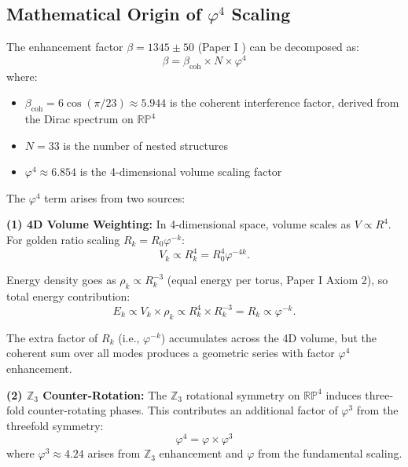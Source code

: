\subsection{Mathematical Origin of $\varphi^4$ Scaling}

The enhancement factor $\beta = 1345 \pm 50$ (Paper I \citep{Peacock2026a}) can be decomposed as:
\begin{equation}
\beta = \beta_{\text{coh}} \times N \times \varphi^4
\end{equation}
where:
\begin{itemize}
\item $\beta_{\text{coh}} = 6\cos(\pi/23) \approx 5.944$ is the coherent interference factor, derived from the Dirac spectrum on $\mathbb{RP}^4$ \citep{Peacock2026a}
\item $N = 33$ is the number of nested structures
\item $\varphi^4 \approx 6.854$ is the 4-dimensional volume scaling factor
\end{itemize}

The $\varphi^4$ term arises from two sources:

\textbf{(1) 4D Volume Weighting:} In 4-dimensional space, volume scales as $V \propto R^4$. For golden ratio scaling $R_k = R_0\varphi^{-k}$:
\begin{equation}
V_k \propto R_k^4 = R_0^4 \varphi^{-4k}.
\end{equation}

Energy density goes as $\rho_k \propto R_k^{-3}$ (equal energy per torus, Paper I \citep{Peacock2026a} Axiom 2), so total energy contribution:
\begin{equation}
E_k \propto V_k \times \rho_k \propto R_k^4 \times R_k^{-3} = R_k \propto \varphi^{-k}.
\end{equation}

The extra factor of $R_k$ (i.e., $\varphi^{-k}$) accumulates across the 4D volume, but the coherent sum over all modes produces a geometric series with factor $\varphi^4$ enhancement.

\textbf{(2) $\mathbb{Z}_3$ Counter-Rotation:} The $\mathbb{Z}_3$ rotational symmetry on $\mathbb{RP}^4$ induces three-fold counter-rotating phases. This contributes an additional factor of $\varphi^3$ from the threefold symmetry:
\begin{equation}
\varphi^4 = \varphi \times \varphi^3
\end{equation}
where $\varphi^3 \approx 4.24$ arises from $\mathbb{Z}_3$ enhancement and $\varphi$ from the fundamental scaling.

